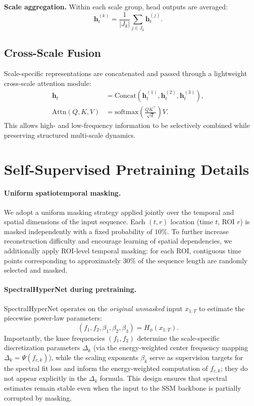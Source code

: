 \documentclass{article}
\begin{document}
\textbf{Scale aggregation.} Within each scale group, head outputs are averaged:
\begin{equation}
\mathbf{h}^{(k)}_t = \frac{1}{|J_k|} \sum_{j \in J_k} \mathbf{h}^{(j)}_t.
\end{equation}

\subsection{Cross-Scale Fusion}

Scale-specific representations are concatenated and passed through a lightweight cross-scale attention module:
\begin{align}
\mathbf{h}_t &= \mathrm{Concat}(\mathbf{h}^{(1)}_t, \mathbf{h}^{(2)}_t, \mathbf{h}^{(3)}_t), \\
\mathrm{Attn}(Q, K, V) &= \mathrm{softmax}\!\left( \frac{QK^\top}{\sqrt{d}} \right) V.
\end{align}
This allows high- and low-frequency information to be selectively combined while preserving structured multi-scale dynamics.

\section{Self-Supervised Pretraining Details}
\label{sec:appx:pretraining}

\paragraph{Uniform spatiotemporal masking.}
We adopt a uniform masking strategy applied jointly over the temporal and spatial dimensions of the input sequence.
Each $(t,r)$ location (time $t$, ROI $r$) is masked independently with a fixed probability of $10\%$.
To further increase reconstruction difficulty and encourage learning of spatial dependencies, we additionally apply ROI-level temporal masking: for each ROI, contiguous time points corresponding to approximately $30\%$ of the sequence length are randomly selected and masked.

\paragraph{SpectralHyperNet during pretraining.}
SpectralHyperNet operates on the \emph{original unmasked} input $x_{1:T}$ to estimate the piecewise power-law parameters:
\[
(f_1, f_2, \beta_1, \beta_2, \beta_3) = H_{\phi}(x_{1:T}).
\]
Importantly, the knee frequencies $(f_1, f_2)$ determine the scale-specific discretization parameters $\Delta_k$ (via the energy-weighted center frequency mapping $\Delta_k = \Psi(f_{c,k})$), while the scaling exponents $\beta_k$ serve as supervision targets for the spectral fit loss and inform the energy-weighted computation of $f_{c,k}$; they do not appear explicitly in the $\Delta_k$ formula. This design ensures that spectral estimates remain stable even when the input to the SSM backbone is partially corrupted by masking.
\end{document}

